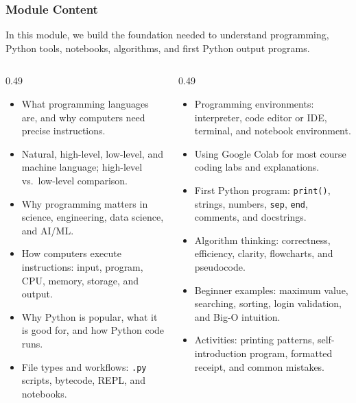 \documentclass[aspectratio=169,10pt]{beamer}
\begin{document}
\begin{frame}
\frametitle{Module Content}
{\large In this module, we build the foundation needed to understand programming,
Python tools, notebooks, algorithms, and first Python output programs.}

\vspace{0.20cm}
\scriptsize
\begin{columns}[T,totalwidth=\textwidth]
\begin{column}{0.49\textwidth}
\begin{itemize}\setlength\itemsep{0.08cm}
  \item What programming languages are, and why computers need precise instructions.
  \item Natural, high-level, low-level, and machine language; high-level vs.\ low-level comparison.
  \item Why programming matters in science, engineering, data science, and AI/ML.
  \item How computers execute instructions: input, program, CPU, memory, storage, and output.
  \item Why Python is popular, what it is good for, and how Python code runs.
  \item File types and workflows: \texttt{.py} scripts, bytecode, REPL, and notebooks.
\end{itemize}
\end{column}
\begin{column}{0.49\textwidth}
\begin{itemize}\setlength\itemsep{0.08cm}
  \item Programming environments: interpreter, code editor or IDE, terminal, and notebook environment.
  \item Using Google Colab for most course coding labs and explanations.
  \item First Python program: \texttt{print()}, strings, numbers, \texttt{sep}, \texttt{end}, comments, and docstrings.
  \item Algorithm thinking: correctness, efficiency, clarity, flowcharts, and pseudocode.
  \item Beginner examples: maximum value, searching, sorting, login validation, and Big-O intuition.
  \item Activities: printing patterns, self-introduction program, formatted receipt, and common mistakes.
\end{itemize}
\end{column}
\end{columns}
\end{frame}
\end{document}
